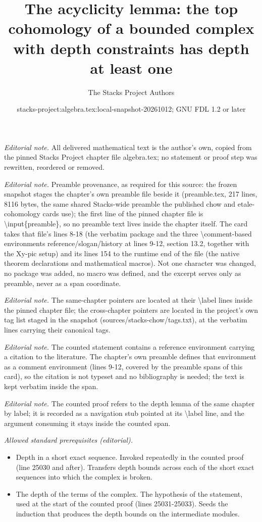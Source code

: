 \documentclass[10pt,a4paper]{amsart}
\title{The acyclicity lemma: the top cohomology of a bounded complex with depth constraints has depth at least one}
\author{The Stacks Project Authors}
\date{stacks-project:algebra.tex:local-snapshot-20261012; GNU FDL 1.2 or later}
\theoremstyle{plain}
\theoremstyle{definition}
\theoremstyle{remark}
\numberwithin{equation}{subsection}
\begin{document}
\maketitle
\noindent\textit{Editorial note.} All delivered mathematical text is the author's own, copied from the pinned Stacks Project chapter file algebra.tex; no statement or proof step was rewritten, reordered or removed.\par\medskip
\noindent\textit{Editorial note.} Preamble provenance, as required for this source: the frozen snapshot stages the chapter's own preamble file beside it (preamble.tex, 217 lines, 8116 bytes, the same shared Stacks-wide preamble the published chow and etale-cohomology cards use); the first line of the pinned chapter file is \textbackslash{}input\{preamble\}, so no preamble text lives inside the chapter itself. The card takes that file's lines 8-18 (the verbatim package and the three \textbackslash{}comment-based environments reference/slogan/history at lines 9-12, section 13.2, together with the Xy-pic setup) and its lines 154 to the runtime end of the file (the native theorem declarations and mathematical macros). Not one character was changed, no package was added, no macro was defined, and the excerpt serves only as preamble, never as a span coordinate.\par\medskip
\noindent\textit{Editorial note.} The same-chapter pointers are located at their \textbackslash{}label lines inside the pinned chapter file; the cross-chapter pointers are located in the project's own tag list staged in the snapshot (sources/stacks-chow/tags.txt), at the verbatim lines carrying their canonical tags.\par\medskip
\noindent\textit{Editorial note.} The counted statement contains a reference environment carrying a citation to the literature. The chapter's own preamble defines that environment as a comment environment (lines 9-12, covered by the preamble spans of this card), so the citation is not typeset and no bibliography is needed; the text is kept verbatim inside the span.\par\medskip
\noindent\textit{Editorial note.} The counted proof refers to the depth lemma of the same chapter by label; it is recorded as a navigation stub pointed at its \textbackslash{}label line, and the argument consuming it stays inside the counted span.\par\medskip
\noindent\textit{Allowed standard prerequisites (editorial).}\begin{itemize}
\item Depth in a short exact sequence. Invoked repeatedly in the counted proof (line 25030 and after). Transfers depth bounds across each of the short exact sequences into which the complex is broken.
\item The depth of the terms of the complex. The hypothesis of the statement, used at the start of the counted proof (lines 25031-25033). Seeds the induction that produces the depth bounds on the intermediate modules.
\end{itemize}\medskip
\end{document}
